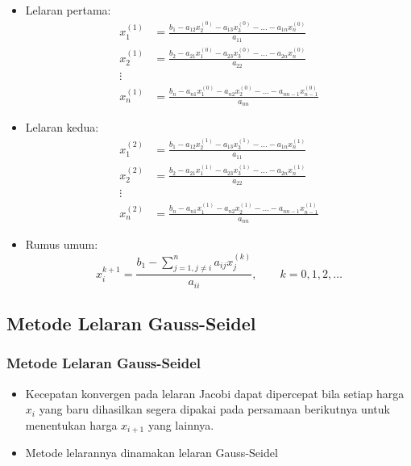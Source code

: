 \documentclass[pdflatex,compress,mathserif]{beamer}
\begin{document}
\begin{frame}
	\begin{itemize}
		\item Lelaran pertama:
		\begin{align*}
			x_1^{(1)} &= \frac{b_1 - a_{12}x_2^{(0)} - a_{13}x_3^{(0)} - \dots - a_{1n}x_n^{(0)}}{a_{11}} \\
			x_2^{(1)} &= \frac{b_2 - a_{21}x_1^{(0)} - a_{23}x_3^{(0)} - \dots - a_{2n}x_n^{(0)}}{a_{22}} \\
			\vdots\\
			x_n^{(1)} &= \frac{b_n - a_{n1}x_1^{(0)} - a_{n2}x_2^{(0)} - \dots - a_{nn-1}x_{n-1}^{(0)}}{a_{nn}}
		\end{align*}
	\end{itemize}
\end{frame}

\begin{frame}
	\begin{itemize}
		\item Lelaran kedua:
		\begin{align*}
		x_1^{(2)} &= \frac{b_1 - a_{12}x_2^{(1)} - a_{13}x_3^{(1)} - \dots - a_{1n}x_n^{(1)}}{a_{11}} \\
		x_2^{(2)} &= \frac{b_2 - a_{21}x_1^{(1)} - a_{23}x_3^{(1)} - \dots - a_{2n}x_n^{(1)}}{a_{22}} \\
		\vdots\\
		x_n^{(2)} &= \frac{b_n - a_{n1}x_1^{(1)} - a_{n2}x_2^{(1)} - \dots - a_{nn-1}x_{n-1}^{(1)}}{a_{nn}}
		\end{align*}
	\end{itemize}
\end{frame}

\begin{frame}
	\begin{itemize}
		\item Rumus umum:
		\[ x_i^{k+1} = \frac{b_1 - \sum\limits_{j=1,j \neq i}^{n}a_{ij}x_j^{(k)}}{a_{ii}},\qquad k=0,1,2,\dots \]
	\end{itemize}
\end{frame}

\subsection{Metode Lelaran Gauss-Seidel}

\begin{frame}
	\frametitle{Metode Lelaran Gauss-Seidel}
	\begin{itemize}
		\item Kecepatan konvergen pada lelaran Jacobi dapat dipercepat bila setiap harga $ x_i $ yang baru dihasilkan segera dipakai pada persamaan berikutnya untuk menentukan harga $ x_{i+1} $ yang lainnya.
		\item Metode lelarannya dinamakan lelaran Gauss-Seidel
	\end{itemize}
\end{frame}
\end{document}
